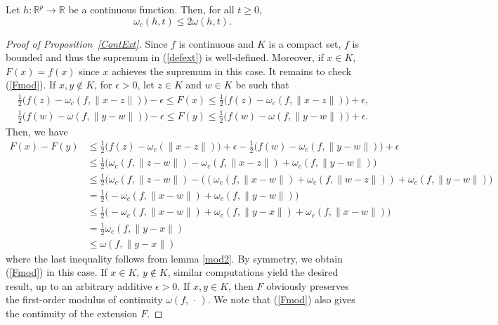 \documentclass[anon,12pt]{colt2021} %
\begin{document}
\begin{lemma} \label{mod2}
Let $h: \mathbb{R}^{p} \rightarrow \mathbb{R}$ be a continuous function. Then, for all $t \geq 0$,
\begin{equation*}
    \omega_{c}(h,t) \leq 2 \omega(h, t).
\end{equation*}
\end{lemma}


\begin{proof}[{Proof of Proposition~\ref{ContExt}}]
Since $f$ is continuous and $K$ is a compact set, $f$ is bounded and thus the supremum in (\ref{defext}) is well-defined. Moreover, if $x \in K$, $F(x) = f(x)$ since $x$ achieves the supremum in this case. It remains to check (\ref{Fmod}). If $x, y \notin K$, for $\epsilon > 0$, let $z \in K$ and $w \in K$ be such that
\begin{align*}
    & \frac{1}{2} \big( f(z) - \omega_{c}(f, \| x - z \|) \big) - \epsilon \leq F(x) \leq \frac{1}{2} \big( f(z) - \omega_{c}(f, \| x - z \|) \big)+ \epsilon, \\
    & \frac{1}{2} \big( f(w) - \omega(f, \| y - w \|) \big) - \epsilon \leq F(y) \leq \frac{1}{2} \big( f(w) - \omega(f, \| y - w \|) \big) + \epsilon.
\end{align*}
Then, we have
\begin{align*}
    F(x) - F(y) & \leq \frac{1}{2} \big( f(z) - \omega_{c}(\| x - z \|) \big) + \epsilon - \frac{1}{2} \big(f(w) - \omega_{c}(f, \| y - w \|) \big) + \epsilon \\
    & \leq \frac{1}{2} \bigg( \omega_{c}(f, \| z - w \|) - \omega_{c}(f, \| x - z \|) + \omega_{c}(f, \| y - w \|) \bigg) \\
    & \leq \frac{1}{2} \bigg( \omega_{c}(f, \| z - w \|) - ((\omega_{c}(f, \| x -  w\|) + \omega_{c}(f, \| w - z \|)) + \omega_{c}(f, \| y - w \|) \bigg) \\
    & = \frac{1}{2} \bigg( - \omega_{c}(f, \| x - w\|) + \omega_{c}(f, \| y - w \|) \bigg) \\
    & \leq \frac{1}{2} \bigg( - \omega_{c}(f, \| x - w\|) + \omega_{c}(f, \| y - x \|) + \omega_{c}(f,\| x- w \|) \bigg)\\
    & = \frac{1}{2}\omega_{c}(f, \| y - x \|) \\
    & \leq \omega(f, \| y - x \|)
\end{align*}
where the last inequality follows from lemma \ref{mod2}. By symmetry, we obtain (\ref{Fmod}) in this case. If $x \in K$, $y \notin K$, similar computations yield the desired result, up to an arbitrary additive $\epsilon > 0$. If $x, y \in K$, then $F$ obviously preserves the first-order modulus of continuity $\omega(f, \, \cdot \,)$. We note that (\ref{Fmod}) also gives the continuity of the extension $F$.
\end{proof}
\end{document}
